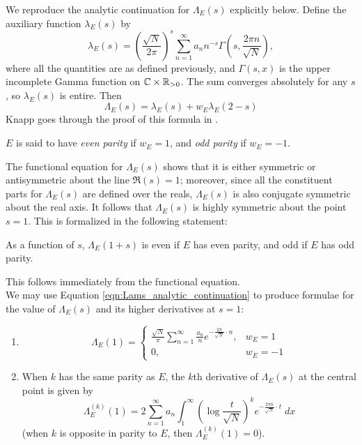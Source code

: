 \documentclass[10pt]{article}
\newcommand{\Lams}{\Lambda_E(s)}
\begin{document}
We reproduce the analytic continuation for $\Lams$ explicitly below. Define the auxiliary function $\lambda_E(s)$ by
\begin{equation}\label{eqn:Lams_analytic_continuation}
\lambda_E(s) = \left(\frac{\sqrt{N}}{2\pi}\right)^{s} \sum_{n=1}^\infty a_n n^{-s}\Gamma \left(s,\frac{2\pi n}{\sqrt{N}}\right),
\end{equation}
where all the quantities are as defined previously, and $\Gamma(s,x)$ is the upper incomplete Gamma function on $\mathbb{C}\times \mathbb{R}_{>0}$. The sum converges absolutely for any $s$, so $\lambda_E(s)$ is entire. Then
\begin{equation}
\Lambda_E(s) = \lambda_E(s) + w_E \lambda_E(2-s)
\end{equation}
Knapp goes through the proof of this formula in \cite[pp. 270-271]{Kna-1992}. \\

\begin{definition}
$E$ is said to have {\it even parity} if $w_E = 1$, and {\it odd parity} if $w_E = -1$.
\end{definition}

The functional equation for $\Lams$ shows that it is either symmetric or antisymmetric about the line $\Re(s) = 1$; moreover, since all the constituent parts for $\Lams$ are defined over the reals, $\Lams$ is also conjugate symmetric about the real axis. It follows that $\Lams$ is highly symmetric about the point $s=1$. This is formalized in the following statement:
\begin{proposition}
As a function of $s$, $\Lambda_E(1+s)$ is even if $E$ has even parity, and odd if $E$ has odd parity.
\end{proposition}
This follows immediately from the functional equation. \\

We may use Equation \ref{eqn:Lams_analytic_continuation} to produce formulae for the value of $\Lams$ and its higher derivatives at $s=1$:
\begin{proposition} \mbox{}
\begin{enumerate}
\item \begin{equation}
\Lambda_E(1) = \begin{cases} \frac{\sqrt{N}}{\pi} \sum_{n=1}^{\infty}\frac{a_n}{n} e^{-\frac{2\pi}{\sqrt{N}}\cdot n}, & w_E = 1 \\ 0, & w_E = -1 \end{cases}
\end{equation}
\item When $k$ has the same parity as $E$, the $k$th derivative of $\Lams$ at the central point is given by
\begin{equation}\label{eqn:central_derivatives}
\Lambda_E^{(k)}(1) = 2 \sum_{n=1}^\infty a_n \int_{1}^{\infty} \left(\log \frac{t}{\sqrt{N}}\right)^k e^{-\frac{2\pi n}{\sqrt{N}}\cdot t} \; dx
\end{equation}
(when $k$ is opposite in parity to $E$, then $\Lambda_E^{(k)}(1) = 0$).
\end{enumerate}
\end{proposition}
\end{document}
